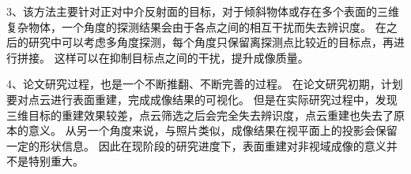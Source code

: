 3、该方法主要针对正对中介反射面的目标，对于倾斜物体或存在多个表面的三维复杂物体，一个角度的探测结果会由于各点之间的相互干扰而失去辨识度。
在之后的研究中可以考虑多角度探测，每个角度只保留离探测点比较近的目标点，再进行拼接。
这样可以在抑制目标点之间的干扰，提升成像质量。

4、论文研究过程，也是一个不断推翻、不断完善的过程。
在论文研究初期，计划要对点云进行表面重建，完成成像结果的可视化。
但是在实际研究过程中，发现三维目标的重建效果较差，点云筛选之后会完全失去辨识度，点云重建也失去了原本的意义。
从另一个角度来说，与照片类似，成像结果在视平面上的投影会保留一定的形状信息。
因此在现阶段的研究进度下，表面重建对非视域成像的意义并不是特别重大。

